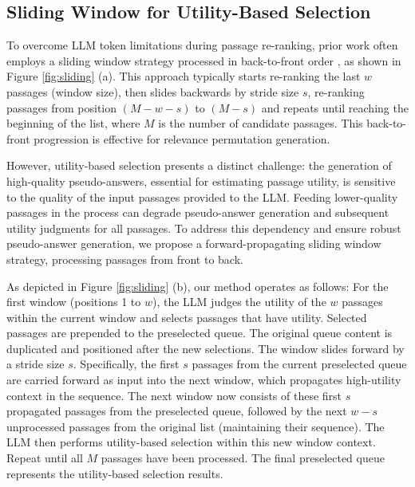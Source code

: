 \subsection{Sliding Window for Utility-Based Selection} 
To overcome LLM token limitations during passage re-ranking, prior work often employs a sliding window strategy processed in back-to-front order \cite{sun2023chatgpt}, as shown in Figure \ref{fig:sliding} (a). This approach typically starts re-ranking the last $w$ passages (window size), then slides backwards by stride size $s$, re-ranking passages from position $(M-w-s)$ to $(M-s)$ and repeats until reaching the beginning of the list, where $M$ is the number of candidate passages. This back-to-front progression is effective for relevance permutation generation.

However, utility-based selection presents a distinct challenge: the generation of high-quality pseudo-answers, essential for estimating passage utility, is sensitive to the quality of the input passages provided to the LLM. 
Feeding lower-quality passages in the process can degrade pseudo-answer generation and subsequent utility judgments for all passages. 
To address this dependency and ensure robust pseudo-answer generation, we propose a forward-propagating sliding window strategy, processing passages from front to back.

As depicted in Figure \ref{fig:sliding} (b), our method operates as follows: 
For the first window (positions 1 to $w$), the LLM judges the utility of the $w$ passages within the current window and selects passages that have utility. 
Selected passages are prepended to the preselected queue. 
The original queue content is duplicated and positioned after the new selections.
The window slides forward by a stride size $s$. 
Specifically, the first $s$ passages from the current preselected queue are carried forward as input into the next window, which propagates high-utility context in the sequence. 
The next window now consists of these first $s$ propagated passages from the preselected queue, followed by the next $w-s$ unprocessed passages from the original list (maintaining their sequence). 
The LLM then performs utility-based selection within this new window context. Repeat until all $M$ passages have been processed. The final preselected queue represents the utility-based selection results.


